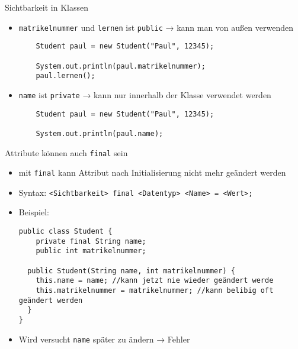 \documentclass{../../presentation}
\begin{document}
\begin{frame}[fragile]{Sichtbarkeit in Klassen}

\begin{itemize}

  \item<2-> \texttt{matrikelnummer} und \texttt{lernen} ist \texttt{public} → kann man von außen verwenden
  \begin{verbatim}
    Student paul = new Student("Paul", 12345);

    System.out.println(paul.matrikelnummer);
    paul.lernen();
  \end{verbatim}
	\item<4-> \texttt{name} ist \texttt{private} → kann nur innerhalb der Klasse verwendet werden
	\begin{verbatim}
    Student paul = new Student("Paul", 12345);

    System.out.println(paul.name);
  \end{verbatim}
\end{itemize}
\end{frame}


\begin{frame}[fragile]{Attribute können auch \texttt{final} sein}

\begin{itemize}
  \item<2-> mit \texttt{final} kann Attribut nach Initialisierung nicht mehr geändert werden
  \item<3-> Syntax: \texttt{<Sichtbarkeit> final <Datentyp> <Name> = <Wert>;}
  \item<4-> Beispiel:
\begin{verbatim}
public class Student {
    private final String name;
    public int matrikelnummer;
    
  public Student(String name, int matrikelnummer) {
    this.name = name; //kann jetzt nie wieder geändert werde
    this.matrikelnummer = matrikelnummer; //kann belibig oft geändert werden
  }
}
\end{verbatim}

  \item<5-> Wird versucht \texttt{name} später zu ändern → \alert{Fehler}
\end{itemize}

\end{frame}
\end{document}
